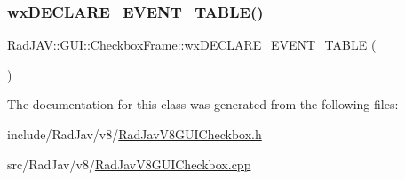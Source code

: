 \subsubsection{\texorpdfstring{wx\+D\+E\+C\+L\+A\+R\+E\+\_\+\+E\+V\+E\+N\+T\+\_\+\+T\+A\+B\+L\+E()}{wxDECLARE\_EVENT\_TABLE()}}
{\footnotesize\ttfamily Rad\+J\+A\+V\+::\+G\+U\+I\+::\+Checkbox\+Frame\+::wx\+D\+E\+C\+L\+A\+R\+E\+\_\+\+E\+V\+E\+N\+T\+\_\+\+T\+A\+B\+LE (\begin{DoxyParamCaption}{ }\end{DoxyParamCaption})\hspace{0.3cm}{\ttfamily [protected]}}



The documentation for this class was generated from the following files\+:\begin{DoxyCompactItemize}
\item 
include/\+Rad\+Jav/v8/\mbox{\hyperlink{_rad_jav_v8_g_u_i_checkbox_8h}{Rad\+Jav\+V8\+G\+U\+I\+Checkbox.\+h}}\item 
src/\+Rad\+Jav/v8/\mbox{\hyperlink{_rad_jav_v8_g_u_i_checkbox_8cpp}{Rad\+Jav\+V8\+G\+U\+I\+Checkbox.\+cpp}}\end{DoxyCompactItemize}
